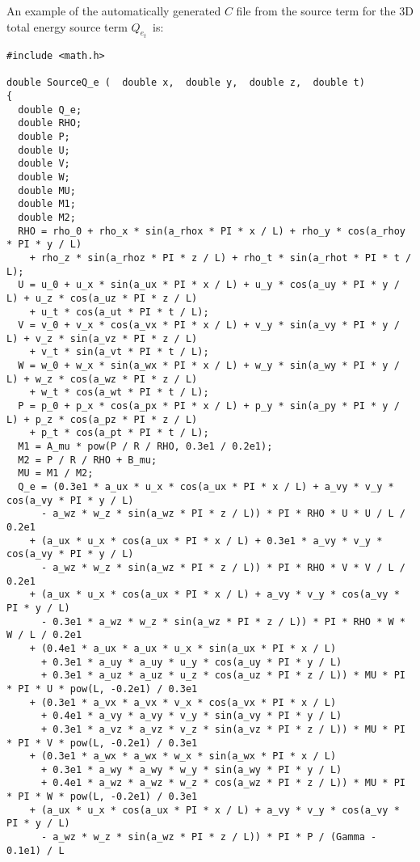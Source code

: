 \documentclass[10pt]{article}
\begin{document}
An example of the automatically generated $C$ file from the source term for the 3D total energy source term $Q_{e_t}$~is:

\begin{small}
\begin{verbatim}
#include <math.h>

double SourceQ_e (  double x,  double y,  double z,  double t)
{
  double Q_e;
  double RHO;
  double P;
  double U;
  double V;
  double W;
  double MU;
  double M1;
  double M2;
  RHO = rho_0 + rho_x * sin(a_rhox * PI * x / L) + rho_y * cos(a_rhoy * PI * y / L)
    + rho_z * sin(a_rhoz * PI * z / L) + rho_t * sin(a_rhot * PI * t / L);
  U = u_0 + u_x * sin(a_ux * PI * x / L) + u_y * cos(a_uy * PI * y / L) + u_z * cos(a_uz * PI * z / L)
    + u_t * cos(a_ut * PI * t / L);
  V = v_0 + v_x * cos(a_vx * PI * x / L) + v_y * sin(a_vy * PI * y / L) + v_z * sin(a_vz * PI * z / L)
    + v_t * sin(a_vt * PI * t / L);
  W = w_0 + w_x * sin(a_wx * PI * x / L) + w_y * sin(a_wy * PI * y / L) + w_z * cos(a_wz * PI * z / L)
    + w_t * cos(a_wt * PI * t / L);
  P = p_0 + p_x * cos(a_px * PI * x / L) + p_y * sin(a_py * PI * y / L) + p_z * cos(a_pz * PI * z / L)
    + p_t * cos(a_pt * PI * t / L);
  M1 = A_mu * pow(P / R / RHO, 0.3e1 / 0.2e1);
  M2 = P / R / RHO + B_mu;
  MU = M1 / M2;
  Q_e = (0.3e1 * a_ux * u_x * cos(a_ux * PI * x / L) + a_vy * v_y * cos(a_vy * PI * y / L)
      - a_wz * w_z * sin(a_wz * PI * z / L)) * PI * RHO * U * U / L / 0.2e1
    + (a_ux * u_x * cos(a_ux * PI * x / L) + 0.3e1 * a_vy * v_y * cos(a_vy * PI * y / L)
      - a_wz * w_z * sin(a_wz * PI * z / L)) * PI * RHO * V * V / L / 0.2e1
    + (a_ux * u_x * cos(a_ux * PI * x / L) + a_vy * v_y * cos(a_vy * PI * y / L)
      - 0.3e1 * a_wz * w_z * sin(a_wz * PI * z / L)) * PI * RHO * W * W / L / 0.2e1
    + (0.4e1 * a_ux * a_ux * u_x * sin(a_ux * PI * x / L)
      + 0.3e1 * a_uy * a_uy * u_y * cos(a_uy * PI * y / L)
      + 0.3e1 * a_uz * a_uz * u_z * cos(a_uz * PI * z / L)) * MU * PI * PI * U * pow(L, -0.2e1) / 0.3e1
    + (0.3e1 * a_vx * a_vx * v_x * cos(a_vx * PI * x / L)
      + 0.4e1 * a_vy * a_vy * v_y * sin(a_vy * PI * y / L)
      + 0.3e1 * a_vz * a_vz * v_z * sin(a_vz * PI * z / L)) * MU * PI * PI * V * pow(L, -0.2e1) / 0.3e1
    + (0.3e1 * a_wx * a_wx * w_x * sin(a_wx * PI * x / L)
      + 0.3e1 * a_wy * a_wy * w_y * sin(a_wy * PI * y / L)
      + 0.4e1 * a_wz * a_wz * w_z * cos(a_wz * PI * z / L)) * MU * PI * PI * W * pow(L, -0.2e1) / 0.3e1
    + (a_ux * u_x * cos(a_ux * PI * x / L) + a_vy * v_y * cos(a_vy * PI * y / L)
      - a_wz * w_z * sin(a_wz * PI * z / L)) * PI * P / (Gamma - 0.1e1) / L

\end{verbatim}
\end{small}
\end{document}
